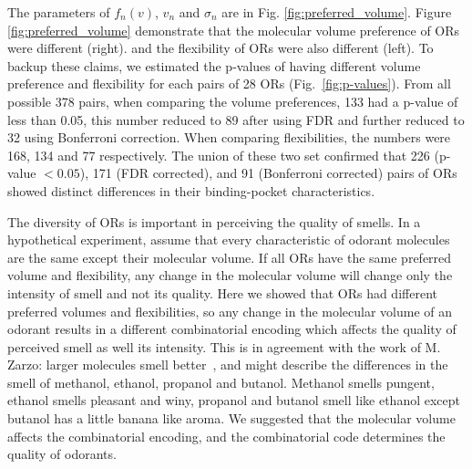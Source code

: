 \documentclass[fleqn,10pt]{wlscirep} %
\newcommand{\numberofreceptors}{ 28 }
\begin{document}
The parameters of $f_n(v)$, $v_n$ and $\sigma_n$ are in Fig. \ref{fig:preferred_volume}.
Figure \ref{fig:preferred_volume} demonstrate that the molecular volume preference of ORs were different (right). 
and the flexibility of ORs were also different (left).
To backup these claims, 
we estimated the p-values of having different volume preference and flexibility for each pairs of \numberofreceptors ORs
(Fig.~\ref{fig:p-values}). 
From all possible 378 pairs, 
when comparing the volume preferences, 
133 had a p-value of less than 0.05, 
this number reduced to 89 after using FDR and further reduced to 32 using Bonferroni correction.
When comparing flexibilities, 
the numbers were 168, 134 and 77 respectively. 
The union of these two set confirmed that 226 (p-value $<0.05$), 171 (FDR corrected), and 91 (Bonferroni corrected) pairs of ORs showed distinct differences in their binding-pocket characteristics.

The diversity of ORs is important in perceiving the quality of smells. 
In a hypothetical experiment, 
assume that every characteristic of odorant molecules are the same except their molecular volume.
If all ORs  have the same preferred volume and flexibility, 
any change in the molecular volume will change only the intensity of smell and not its quality.
Here we showed that ORs  had different preferred volumes and flexibilities, 
so any change in the molecular volume of an odorant results in a different combinatorial encoding which affects the quality of perceived smell as well its intensity.
This is in agreement with the work of M. Zarzo: larger molecules  smell better~\cite{zarzo2011},
and might describe the differences in the smell of methanol, ethanol, propanol and butanol. 
Methanol smells pungent, ethanol smells pleasant and winy, propanol and butanol smell like ethanol except butanol has a little banana like aroma.
We suggested that the molecular volume affects the combinatorial encoding, 
and the combinatorial code determines the quality of odorants.
\end{document}
